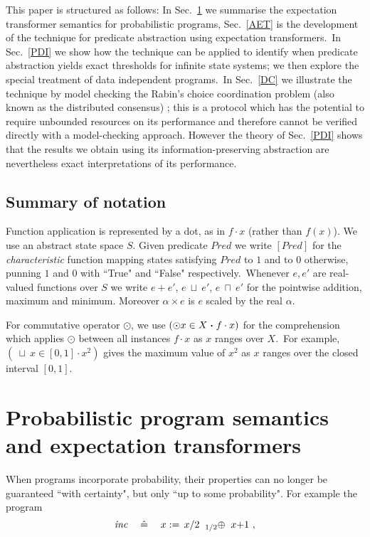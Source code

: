 \documentclass[numbers,copyright,creativecommons]{eptcs}
\newcommand{\Lift}[1]{[{#1}]}
\newcommand{\Pred}{\textit{Pred}}
\newcommand{\Gets}{:=\,}
\newcommand{\PC}[1]{\mathbin{\makebox[0em]{~}_{#1}\oplus}}
\newcommand{\Min}{~\sqcap~}
\newcommand{\Max}{~\sqcup~}
\newcommand{\CompNY}[3]{(#1#2 \Spot #3)}
\newcommand{\Spot}{\mathrel{\mbox{\boldmath$\cdot$}}}
\newcommand{\Defs}{\mathrel{\hat{=}}}
\newcommand{\Wide}[1]{~~~#1~~~}
\newcommand{\Sec}[1]{Sec.~\ref{#1}}
\begin{document}
 This paper is structured as follows: In \Sec{ppt} we summarise the expectation transformer semantics for probabilistic programs, \Sec{AET} is the development of the technique for predicate abstraction using expectation transformers.\ In \Sec{PDI} we show how the technique can be applied to identify when  predicate abstraction yields exact thresholds for infinite state systems; we then explore the special treatment of data independent programs.\ In \Sec{DC} we illustrate the technique by model checking the Rabin's choice coordination problem (also known as the distributed consensus) \cite{Rabin82}; this is a protocol which  has the potential to require unbounded resources on its performance and therefore cannot be verified directly with a model-checking approach. However the theory of \Sec{PDI} shows that the results we obtain using its information-preserving abstraction are nevertheless exact interpretations of its performance.

\subsection{Summary of notation}
Function application
is represented by a dot, as in $f\cdot x$ (rather than $f(x)$).
We use an abstract state space $S$.
Given predicate $\Pred$ we write
$\Lift{\Pred}$ for the \emph{characteristic} function mapping states satisfying $\Pred$ to
$1$ and to $0$ otherwise, punning $1$  and $0$ with ``True" and ``False" respectively.\ Whenever $e, e'$ are real-valued functions  over $S$ we write $e+e'$, $e\Max e'$, $e \Min e'$ for the pointwise addition, maximum and minimum. Moreover $\alpha {\times} e$ is $e$ scaled by the real $\alpha$.

For commutative operator $\odot$, we use  $\CompNY{\odot}{x \in X}{f\cdot x}$ for the comprehension which applies $\odot$ between all instances $f\cdot x$ as $x$ ranges over $X$.\ For example, $(\Max x \in [0, 1] \cdot x^{2})$ gives the maximum value of $x^{2}$ as $x$ ranges over the closed interval $[0, 1]$.



\section{Probabilistic program semantics and expectation transformers}\label{ppt}

When programs incorporate probability,  their properties can no longer be guaranteed
``with certainty", but only
 ``up to some probability".
For example the program
\begin{equation}\label{e1524}
\textit{inc} \Wide{\Defs} x \Gets x/2 ~\PC{1/2}~ x{+}1~,
\end{equation}
\end{document}
